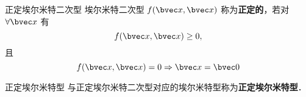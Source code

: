 \begin{definition}{正定埃尔米特二次型}
埃尔米特二次型 $f(\bvec x,\bvec x)$ 称为\textbf{正定的}，若对 $\forall \bvec x$ 有
\begin{equation}
f(\bvec x,\bvec x)\geq0,
\end{equation}
且
\begin{equation}
f(\bvec x,\bvec x)=0\Rightarrow\bvec x=\bvec 0
\end{equation}
\end{definition}
\begin{definition}{正定埃尔米特型}
与正定埃尔米特二次型对应的埃尔米特型称为\textbf{正定埃尔米特型}．
\end{definition}